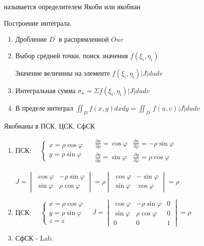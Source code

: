 \documentclass[12pt]{article}
\begin{document}
    называется определителем Якоби или якобиан

    Построение интеграла.
    \begin{enumerate}
        \item Дробление $D^\prime$ в распрямленной $Ouv$
        \item Выбор средней точки, поиск значения $f(\xi_i, \eta_i)$

        Значение величины на элементе $f(\xi_i, \eta_i) |J| du dv$
        \item Интегральная сумма $\sigma_n = \Sigma f(\xi_i, \eta_i) |J| du dv$
        \item В пределе интеграл $\iint_D f(x, y) dx dy = \iint_{D^\prime} f(u, v) |J| du dv$
    \end{enumerate}

    Якобианы в ПСК, ЦСК, СфСК

    \begin{enumerate}
        \item ПСК: $\quad \begin{cases}
                              x = \rho\cos\varphi \\ y = \rho\sin\varphi
        \end{cases} \quad
        \begin{matrix}
            \frac{\partial x}{\partial \rho} = \cos\varphi & \frac{\partial x}{\partial \varphi} = -\rho\sin\varphi \\
            \frac{\partial y}{\partial \rho} = \sin\varphi & \frac{\partial y}{\partial \varphi} = \rho\cos\varphi
        \end{matrix}$

        $J = \begin{vmatrix}\cos\varphi & -\rho\sin\varphi \\ \sin\varphi & \rho\cos\varphi\end{vmatrix} =
        \rho \begin{vmatrix}\cos\varphi & -\sin\varphi \\ \sin\varphi & \cos\varphi\end{vmatrix} = \rho$

        \item ЦСК: $\quad \begin{cases}
                              x = \rho\cos\varphi \\ y = \rho\sin\varphi \\ z = z
        \end{cases} \quad J = \begin{vmatrix}\cos\varphi & -\rho\sin\varphi & 0 \\ \sin\varphi & \rho\cos\varphi & 0 \\ 0 & 0 & 1\end{vmatrix} = \rho$

        \item СфСК - Lab.
    \end{enumerate}
\end{document}
